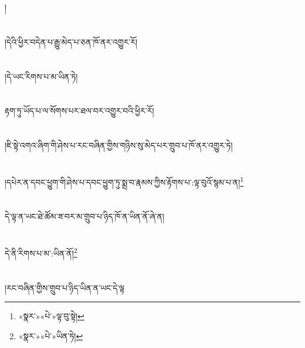 །\chapter{ }།དེའི་ཕྱིར་བདེན་པ་རྒྱུ་མེད་པ་ཅན་ཁོ་ནར་འགྱུར་རོ།\chapter{ }།དེ་ཡང་རིགས་པ་མ་ཡིན་ཏེ།\chapter{ }རྟག་ཏུ་ཡོད་པ་ལ་སོགས་པར་ཐལ་བར་འགྱུར་བའི་ཕྱིར་རོ།\chapter{ }།ཇི་སྟེ་འགའ་ཞིག་གི་ཤེས་པ་རང་བཞིན་གྱིས་གཉིས་སུ་མེད་པར་གྲུབ་པ་ཁོ་ནར་འགྱུར་ཏེ།\chapter{ }།དཔེར་ན་དབང་ཕྱུག་གི་ཤེས་པ་དབང་ཕྱུག་ཏུ་སྨྲ་བ་རྣམས་ཀྱིས་རྟོགས་པ་:ལྟ་བུའོ་སྙམ་པ་ན།\footnote{«སྣར་»«པེ་»ལྟ་བུ་སྟེ།}\chapter{ }དེ་ལྟ་ན་ཡང་ཐེ་ཚོམ་ཟ་བར་མ་གྲུབ་པ་ཉིད་ཁོ་ན་ཡིན་ནོ་ཞེ་ན།\chapter{ }དེ་ནི་རིགས་པ་མ་:ཡིན་ནོ།\footnote{«སྣར་»«པེ་»ཡིན་ཏེ།}\chapter{ }།རང་བཞིན་གྱིས་གྲུབ་པ་ཉིད་ཡིན་ན་ཡང་དེ་ལྟ